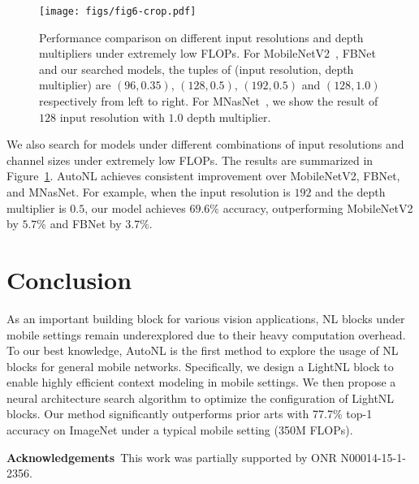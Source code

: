 \documentclass[10pt,twocolumn,letterpaper]{article}
\begin{document}
\begin{figure}[t]
\centering
\texttt{[image: figs/fig6-crop.pdf]}
\caption{Performance comparison on different input resolutions and depth multipliers under extremely low FLOPs. For MobileNetV2~\cite{sandler2018mobilenetv2}, FBNet~\cite{wu2019fbnet} and our searched models, the tuples of (input resolution, depth multiplier) are $(96, 0.35)$, $(128,0.5)$, $(192, 0.5)$ and $(128, 1.0)$ respectively from left to right. For MNasNet~\cite{tan2019mnasnet}, we show the result of $128$ input resolution with $1.0$ depth multiplier.} 
\label{fig:fbnet}
\vspace{-1.5em}
\end{figure}

We also search for models under different combinations of input resolutions and channel sizes under extremely low FLOPs. The results are summarized in Figure~\ref{fig:fbnet}. AutoNL achieves consistent improvement over MobileNetV2, FBNet, and MNasNet. For example, when the input resolution is $192$ and the depth multiplier is $0.5$, our model achieves $69.6\%$ accuracy, outperforming MobileNetV2 by $5.7\%$ and FBNet by $3.7\%$.

\section{Conclusion}
As an important building block for various vision applications, NL blocks under mobile settings remain underexplored due to their heavy computation overhead.
To our best knowledge, AutoNL is the first method to explore the usage of NL blocks for general mobile networks. 
Specifically, we design a LightNL block to enable highly efficient context modeling in mobile settings. We then propose a neural architecture search algorithm to optimize the configuration of LightNL blocks. Our method significantly outperforms prior arts with 77.7\% top-1 accuracy on ImageNet under a typical mobile setting (350M FLOPs).

\small{\vspace{1ex}\noindent\textbf{Acknowledgements}~This work was partially supported by ONR N00014-15-1-2356.}

{\small


}
\end{document}
